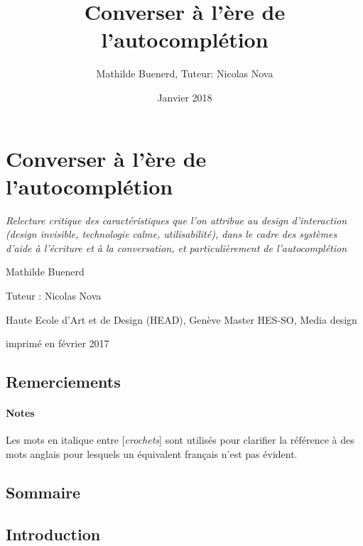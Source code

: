 \documentclass[]{article}
\title{Converser à l'ère de l'autocomplétion}
\author{Mathilde Buenerd, Tuteur: Nicolas Nova}
\date{Janvier 2018}
\let\oldparagraph\paragraph
\renewcommand{\paragraph}[1]{\oldparagraph{#1}\mbox{}}
\begin{document}
\maketitle

\newpage

\hypertarget{converser-uxe0-luxe8re-de-lautocompluxe9tion}{%
\section{Converser à l'ère de
l'autocomplétion}\label{converser-uxe0-luxe8re-de-lautocompluxe9tion}}

\emph{Relecture critique des caractéristiques que l'on attribue au
design d'interaction (\emph{design invisible}, \emph{technologie calme},
\emph{utilisabilité}), dans le cadre des systèmes d'aide à l'écriture et
à la conversation, et particulièrement de l'autocomplétion}

Mathilde Buenerd

Tuteur : Nicolas Nova

Haute Ecole d'Art et de Design (HEAD), Genève Master HES-SO, Media
design

imprimé en février 2017

\newpage

\hypertarget{remerciements}{%
\subsection{Remerciements}\label{remerciements}}

\newpage

\hypertarget{notes}{%
\paragraph{Notes}\label{notes}}

Les mots en italique entre {[}\emph{crochets}{]} sont utilisés pour
clarifier la référence à des mots anglais pour lesquels un équivalent
français n'est pas évident.

\newpage

\hypertarget{sommaire}{%
\subsection{Sommaire}\label{sommaire}}

\newpage

\hypertarget{introduction}{%
\subsection{Introduction}\label{introduction}}
\end{document}
